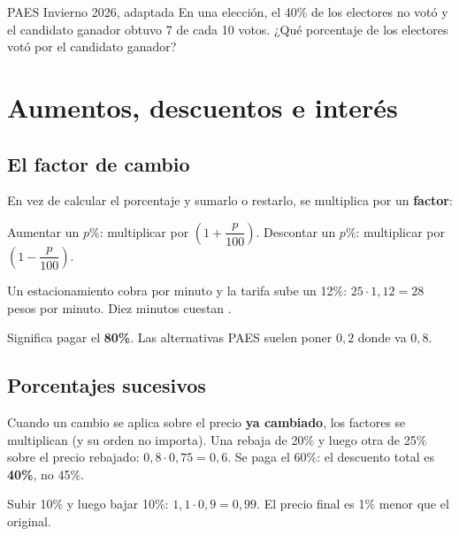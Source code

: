 \begin{elejemplo}{PAES Invierno 2026, adaptada}
En una elección, el 40\% de los electores no votó y el candidato ganador obtuvo 7 de cada 10 votos. ¿Qué porcentaje de los electores votó por el candidato ganador?
\end{elejemplo}

\section{Aumentos, descuentos e interés}

\subsection{El factor de cambio}
En vez de calcular el porcentaje y sumarlo o restarlo, se multiplica por un \textbf{factor}:
\begin{clave}[Factor] Aumentar un $p\%$: multiplicar por $\left(1 + \dfrac{p}{100}\right)$. Descontar un $p\%$: multiplicar por $\left(1 - \dfrac{p}{100}\right)$.\end{clave}
\begin{ejemplo} Un estacionamiento cobra  por minuto y la tarifa sube un 12\%: $25\cdot 1{,}12 = 28$ pesos por minuto. Diez minutos cuestan .\end{ejemplo}
\begin{ojo}[Descuento de 20\%] Significa pagar el \textbf{80\%}. Las alternativas PAES suelen poner $0{,}2$ donde va $0{,}8$.\end{ojo}

\subsection{Porcentajes sucesivos}
Cuando un cambio se aplica sobre el precio \textbf{ya cambiado}, los factores se multiplican (y su orden no importa). Una rebaja de 20\% y luego otra de 25\% sobre el precio rebajado: $0{,}8\cdot 0{,}75 = 0{,}6$. Se paga el 60\%: el descuento total es \textbf{40\%}, no 45\%.
\begin{ojo} Subir 10\% y luego bajar 10\%: $1{,}1\cdot 0{,}9 = 0{,}99$. El precio final es 1\% menor que el original.\end{ojo}

